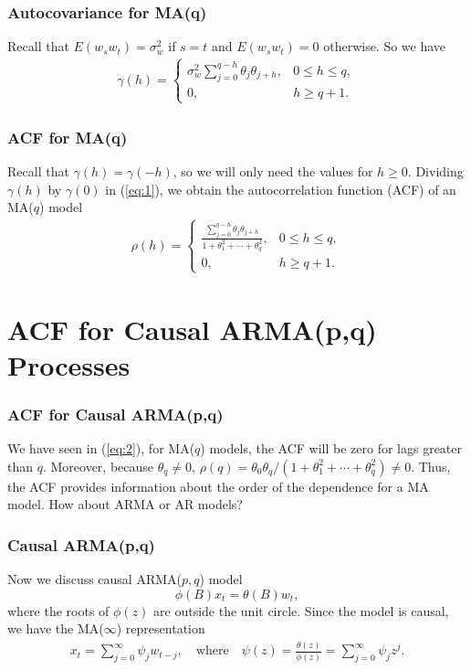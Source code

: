 \documentclass[%
xcolor=pdftex]{beamer}
\begin{document}
\begin{frame}
\frametitle{Autocovariance for MA(q)}

Recall that $E(w_s w_t) = \sigma^2_w$ if $s=t$ and $E(w_s
w_t)=0$ otherwise. So we have
\begin{eqnarray}\label{eq:1}
\gamma(h) = \left \{ \begin{array}{ll}
\sigma^2_w \sum^{q-h}_{j=0} \theta_j \theta_{j+h}, & 0 \le h\le q, \\
0, & h \ge q+1.
\end{array} \right.
\end{eqnarray}


\end{frame}

\begin{frame}
\frametitle{ACF for MA(q)}

Recall that $\gamma(h)=\gamma(-h)$, so we will only need the
values for $h\ge 0$. Dividing $\gamma(h)$ by $\gamma(0)$ in
(\ref{eq:1}), we obtain the autocorrelation function (ACF) of
an MA($q$) model
\begin{eqnarray}\label{eq:2}
\rho(h) = \left \{ \begin{array}{ll}
\frac{\sum^{q-h}_{j=0} \theta_j \theta_{j+h}}{1+\theta^2_1+\cdots+\theta^2_q}, & 0 \le h\le q, \\
0, & h \ge q+1.
\end{array} \right.
\end{eqnarray}


\end{frame}

\section{ACF for Causal ARMA(p,q) Processes}
\frame{\tableofcontents[currentsection]}

\begin{frame}
\frametitle{ACF for Causal ARMA(p,q)}

We have seen in (\ref{eq:2}), for MA($q$) models, the ACF will
be zero for lags greater than $q$. Moreover, because
$\theta_q\ne 0$,
$\rho(q)=\theta_0\theta_q/(1+\theta_1^2+\cdots+\theta^2_q)\ne
0$. Thus, the ACF provides information
about the order of the dependence for a MA model. How about
ARMA or AR models?

\end{frame}

\begin{frame}
\frametitle{Causal ARMA(p,q)}

Now we discuss causal ARMA($p,q$) model
$$
\phi(B) x_t = \theta(B) w_t,
$$
where the roots of $\phi(z)$ are outside the unit circle. Since
the model is causal, we have the MA($\infty$) representation
\begin{eqnarray}\label{eq:3}
x_t = \sum^\infty_{j=0} \psi_j w_{t-j},  \quad \mbox{where} \quad
\psi(z) = \frac{\theta(z)}{\phi(z)} = \sum^\infty_{j=0} \psi_j z^j.
\end{eqnarray}

\end{frame}
\end{document}

